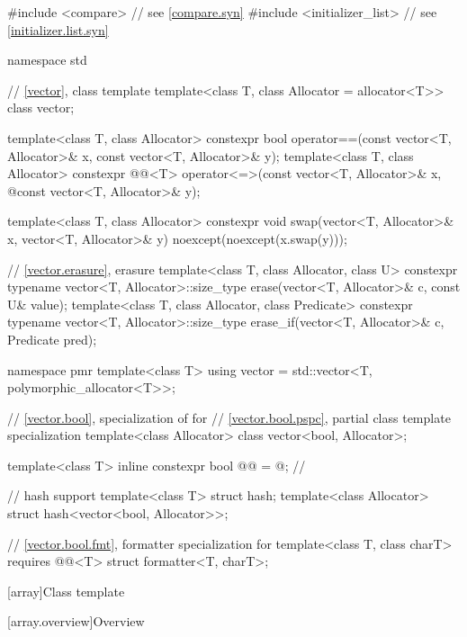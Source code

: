 %
\begin{codeblock}
#include <compare>              // see \ref{compare.syn}
#include <initializer_list>     // see \ref{initializer.list.syn}

namespace std {
  // \ref{vector}, class template 
  template<class T, class Allocator = allocator<T>> class vector;

  template<class T, class Allocator>
    constexpr bool operator==(const vector<T, Allocator>& x, const vector<T, Allocator>& y);
  template<class T, class Allocator>
    constexpr @@<T> operator<=>(const vector<T, Allocator>& x,
              @\itcorr@                                      const vector<T, Allocator>& y);

  template<class T, class Allocator>
    constexpr void swap(vector<T, Allocator>& x, vector<T, Allocator>& y)
      noexcept(noexcept(x.swap(y)));

  // \ref{vector.erasure}, erasure
  template<class T, class Allocator, class U>
    constexpr typename vector<T, Allocator>::size_type
      erase(vector<T, Allocator>& c, const U& value);
  template<class T, class Allocator, class Predicate>
    constexpr typename vector<T, Allocator>::size_type
      erase_if(vector<T, Allocator>& c, Predicate pred);

  namespace pmr {
    template<class T>
      using vector = std::vector<T, polymorphic_allocator<T>>;
  }

  // \ref{vector.bool}, specialization of  for 
  // \ref{vector.bool.pspc}, partial class template specialization 
  template<class Allocator>
    class vector<bool, Allocator>;

  template<class T>
    inline constexpr bool @@ = @\seebelow@;   // \expos

  // hash support
  template<class T> struct hash;
  template<class Allocator> struct hash<vector<bool, Allocator>>;

  // \ref{vector.bool.fmt}, formatter specialization for 
  template<class T, class charT> requires @@<T>
    struct formatter<T, charT>;
}
\end{codeblock}

[array]{Class template }
%

[array.overview]{Overview}

